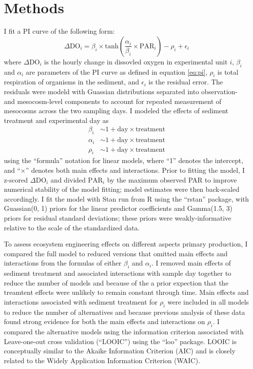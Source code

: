 

\section*{Methods}

I fit a PI curve of the following form:
%
\begin{equation} \label{eq:fit}
  \Delta \text{DO}_i = 
    \beta_i \times \text{tanh}\left(\frac{\alpha_i} {\beta_i} \times \text{PAR}_i\right)
      - \rho_i + \epsilon_i
\end{equation}
%
where $\Delta \text{DO}_i$ is the hourly change in dissovled oxygen 
in experimental unit $i$, 
$\beta_i$ and $\alpha_i$ are parameters of the PI curve as defined in equation \ref{eq:pi},
$\rho_i$ is total respiration of organisms in the sediment,
and $\epsilon_i$ is the residual error.
The residuals were modeld with Guassian distributions 
separated into observation- and mesocosm-level components
to account for repeated measurement of mesocosms across the two sampling days.
I modeled the effects of sediment treatment and experimental day as
%
\begin{equation} \label{eq:lm}
\begin{split}
\beta_i &\sim 1 + \text{day} \times \text{treatment} \\
\alpha_i &\sim 1 + \text{day} \times \text{treatment} \\
\rho_i &\sim 1 + \text{day} \times \text{treatment}
\end{split}
\end{equation}
%
using the ``formula'' notation for linear models, 
where ``1'' denotes the intercept,
and ``$\times$'' denotes both main effects and interactions.
Prior to fitting the model, I z-scored 
$\Delta \text{DO}_i$ and divided $\text{PAR}_i$ by the maximum observed PAR 
to improve numerical stability of the model fitting; 
model estimates were then back-scaled accordingly.
I fit the model with Stan run from R using the ``rstan'' package,
with Guassian(0, 1) priors for the linear predictor coefficients  
and Gamma(1.5, 3) priors for residual standard deviations;
these priors were weakly-informative relative to the scale of the standardized data.

To assess ecosystem engineering effects on different aspects primary production, 
I compared the full model to reduced versions 
that omitted main effects and interactions from the formulas 
of either $\beta_i$ and $\alpha_i$.
I removed main effects of sediment treatment and associated interactions with sample day 
together to reduce the number of models and because of the a prior expection that 
the treamtent effects were unlikely to remain constant through time.
Main effects and interactions associated with sediment treatment for $\rho_i$
were included in all models to reduce the number of alternatives and because 
previous analysis of these data 
found strong evidence for both the main effects and interactions on $\rho_i$.
I compared the alternative models using the information criterion associated 
with Leave-one-out cross validation (``LOOIC'') using the ``loo'' package.
LOOIC is conceptually similar to the  Akaike Information Criterion (AIC) 
and is closely related to the Widely Application Information Criterion (WAIC).
